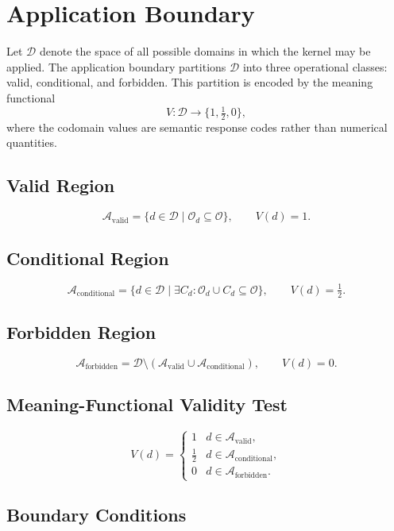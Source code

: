 \documentclass[12pt]{article}
\begin{document}
\section{Application Boundary}

Let $\mathcal{D}$ denote the space of all possible domains in which the kernel may be
applied. The application boundary partitions $\mathcal{D}$ into three operational classes:
valid, conditional, and forbidden. This partition is encoded by the meaning functional
\[
V : \mathcal{D} \to \{1, \tfrac12, 0\},
\]
where the codomain values are semantic response codes rather than numerical
quantities.

\subsection{Valid Region}

\[
\mathcal{A}_{\mathrm{valid}}
= \{ d \in \mathcal{D} \mid \mathcal{O}_d \subseteq \mathcal{O} \},
\qquad
V(d) = 1.
\]

\subsection{Conditional Region}

\[
\mathcal{A}_{\mathrm{conditional}}
= \{ d \in \mathcal{D} \mid \exists C_d : \mathcal{O}_d \cup C_d \subseteq \mathcal{O} \},
\qquad
V(d) = \tfrac12.
\]

\subsection{Forbidden Region}

\[
\mathcal{A}_{\mathrm{forbidden}}
= \mathcal{D} \setminus (\mathcal{A}_{\mathrm{valid}} \cup \mathcal{A}_{\mathrm{conditional}}),
\qquad
V(d) = 0.
\]

\subsection{Meaning-Functional Validity Test}

\[
V(d) =
\begin{cases}
1 & d \in \mathcal{A}_{\mathrm{valid}}, \\
\tfrac12 & d \in \mathcal{A}_{\mathrm{conditional}}, \\
0 & d \in \mathcal{A}_{\mathrm{forbidden}}.
\end{cases}
\]

\subsection{Boundary Conditions}
\end{document}
